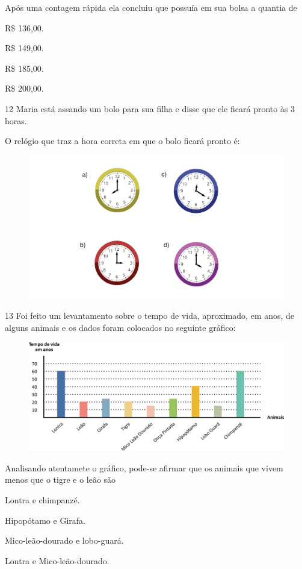 Após uma contagem rápida ela concluiu que possuía em sua bolsa a quantia de

\begin{escolha}
\item
  R\$ 136,00.
\item
  R\$ 149,00.
\item
  R\$ 185,00.
\item
  R\$ 200,00.
\end{escolha}

\pagebreak

\num{12} Maria está assando um bolo para sua filha e disse que ele ficará pronto às 3 horas.

O relógio que traz a hora correta em que o bolo ficará pronto é:

\begin{figure}[htpb!]
\centering
\includegraphics[width=.4\textwidth]{./media/image111.png}
\end{figure}

\num{13} Foi feito um levantamento sobre o tempo de vida, aproximado, em anos, de alguns animais e os dados foram colocados no seguinte gráfico:

\begin{figure}[htpb!]
\centering
\includegraphics[width=.9\textwidth]{./media/image112.png}
\end{figure}

Analisando atentamete o gráfico, pode-se afirmar que os animais que vivem menos que o tigre e o leão são

\begin{escolha}
\item
  Lontra e chimpanzé.
\item
  Hipopótamo e Girafa.
\item
  Mico-leão-dourado e lobo-guará.
\item
  Lontra e Mico-leão-dourado.
\end{escolha}


